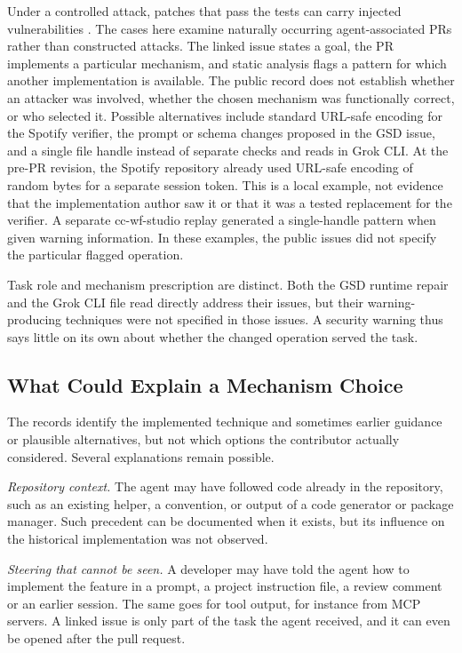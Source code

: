 \documentclass[acmsmall,screen,nonacm]{acmart}
\begin{document}
Under a controlled attack, patches that pass the tests can carry injected vulnerabilities \cite{b3}. The cases here examine naturally occurring agent-associated PRs rather than constructed attacks. The linked issue states a goal, the PR implements a particular mechanism, and static analysis flags a pattern for which another implementation is available. The public record does not establish whether an attacker was involved, whether the chosen mechanism was functionally correct, or who selected it. Possible alternatives include standard URL-safe encoding for the Spotify verifier, the prompt or schema changes proposed in the GSD issue, and a single file handle instead of separate checks and reads in Grok CLI. At the pre-PR revision, the Spotify repository already used URL-safe encoding of random bytes for a separate session token. This is a local example, not evidence that the implementation author saw it or that it was a tested replacement for the verifier. A separate cc-wf-studio replay generated a single-handle pattern when given warning information. In these examples, the public issues did not specify the particular flagged operation.

Task role and mechanism prescription are distinct. Both the GSD runtime repair and the Grok CLI file read directly address their issues, but their warning-producing techniques were not specified in those issues. A security warning thus says little on its own about whether the changed operation served the task.

\subsection{What Could Explain a Mechanism Choice}\label{sec:explain}

The records identify the implemented technique and sometimes earlier guidance or plausible alternatives, but not which options the contributor actually considered. Several explanations remain possible.

\emph{Repository context.} The agent may have followed code already in the repository, such as an existing helper, a convention, or output of a code generator or package manager. Such precedent can be documented when it exists, but its influence on the historical implementation was not observed.

\emph{Steering that cannot be seen.} A developer may have told the agent how to implement the feature in a prompt, a project instruction file, a review comment or an earlier session. The same goes for tool output, for instance from MCP servers. A linked issue is only part of the task the agent received, and it can even be opened after the pull request.
\end{document}

